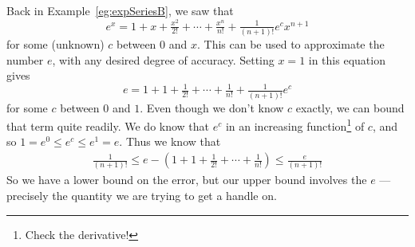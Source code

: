 \begin{eg}\label{eg:exp}
Back in Example~\ref{eg:expSeriesB}, we saw that
\begin{equation*}
e^x =1+x+\tfrac{x^2}{2!}+\cdots+\tfrac{x^n}{n!}+\tfrac{1}{(n+1)!}e^c x^{n+1}
\end{equation*}
for some (unknown) $c$ between $0$ and $x$. This can be used to approximate the number $e$, with any
desired degree of accuracy. Setting $x=1$ in this equation gives
\begin{equation*}
e=1+1+\tfrac{1}{2!}+\cdots+\tfrac{1}{n!}+\tfrac{1}{(n+1)!}e^c
\end{equation*}
for some $c$ between $0$ and $1$. Even though we don't know $c$ exactly, we can bound that term quite readily. We do
know that $e^c$ in an increasing function\footnote{Check the derivative!} of $c$, and so $1=e^0 \leq e^c \leq e^1=e$.
Thus we know that
\begin{align*}
\frac{1}{(n+1)!} \leq e - \left( 1+1+\tfrac{1}{2!}+\cdots+\tfrac{1}{n!} \right) \leq \frac{e}{(n+1)!}
\end{align*}
So we have a lower bound on the error, but our upper bound involves the $e$ --- precisely the quantity we are trying to
get a handle on.


\end{eg}
